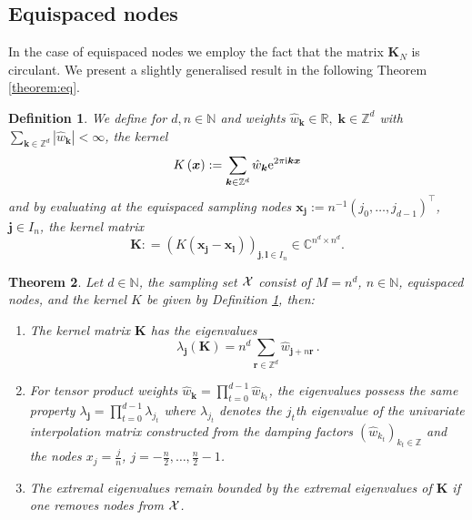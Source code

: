 \documentclass[11pt,a4paper,bibtotoc]{scrartcl}
\def\N{\mathbb{N}}
\def\R{\mathbb{R}}
\def\Z{\mathbb{Z}}
\def\C{\mathbb{C}}
\def\ti{\mbox{\scriptsize{\rm i}}}
\newcommand{\eip}[1]{{\rm e}^{ 2\pi{\ti} #1}}
\newcommand{\zb}[1]{\ensuremath{\boldsymbol{#1}}}
\newtheorem{theorem}{Theorem}[section]
\newtheorem{definition}[theorem]{Definition}
\newenvironment{Theorem}{\goodbreak \begin{theorem}\sl}{\end{theorem}}
\newenvironment{Definition}{\goodbreak \begin{definition}\rm}{\end{definition}}
\numberwithin{equation}{section}
\numberwithin{table}{section}
\numberwithin{figure}{section}
\begin{document}
\subsection*{Equispaced nodes} \label{sect:eq}
In the case of equispaced nodes we employ the fact that the matrix $\zb K_N$
is circulant.
We present a slightly generalised result in the following Theorem
\ref{theorem:eq}.

\begin{Definition}  \label{def:l1kernel}
  We define for $d,n\in\N$ and weights $\hat w_{\zb k} \in \R,\; \zb k \in
  \Z^d$ with $\sum_{\zb k\in \Z^d}|\hat w_{\zb k}| < \infty$, the kernel
  \begin{equation*}
    K \left(\zb x\right):=\sum\limits_{\zb k \in \Z^d} \hat w_{\zb k}
    \eip{\zb k \zb x}
  \end{equation*}
  and by evaluating at the equispaced sampling nodes $\zb x_{\zb j} :=
  n^{-1}(j_0,\hdots,j_{d-1})^{\top}$, $\zb j\in I_n$, the kernel matrix
  \begin{equation*}
    \zb K: = \left(K (\zb x_{\zb j}-\zb x_{\zb l}) \right)_{\zb j,\zb l \in
    I_n} \in \C^{n^d\times n^d}.
  \end{equation*}
\end{Definition}

\begin{Theorem}\label{theorem:eq}
  Let $d\in\N$, the sampling set $\cal X$ consist of $M=n^d$, $n\in\N$,
  equispaced nodes, and the kernel $K$ be given by Definition
  \ref{def:l1kernel}, then:
  \begin{enumerate}
  \item The kernel matrix $\zb K$ has the
    eigenvalues
    \begin{equation*}
      \lambda_{\zb j}\left(\zb K\right)
      = n^d\sum\limits_{\zb r\in \Z^d} \hat w_{\zb j+n\zb r}\, .
    \end{equation*}
  \item For tensor product weights $\hat w_{\zb k}=\prod_{t=0}^{d-1} \hat
    w_{k_t}$, the eigenvalues possess the same property $\lambda_{\zb
    j}=\prod_{t=0}^{d-1} \lambda_{j_t}$ where $\lambda_{j_t}$ denotes the
    $j_t$th eigenvalue of the univariate interpolation matrix constructed from
    the damping factors $(\hat w_{k_t})_{{k_t} \in \Z}$ and the nodes
    $x_j=\frac{j}{n}$, $j=-\frac{n}{2},\hdots,\frac{n}{2}-1$.
  \item The extremal eigenvalues remain bounded by the extremal eigenvalues of
    $\zb K$ if one removes nodes from $\cal X$.
  \end{enumerate}
\end{Theorem}
\end{document}
